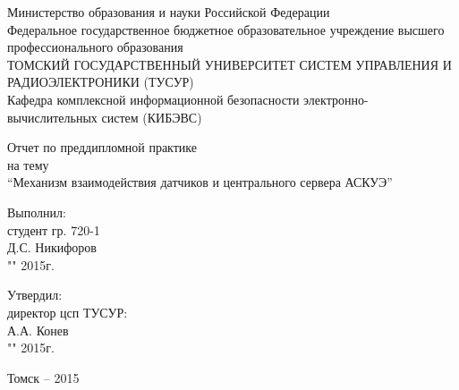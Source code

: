 \newpage
{}

\begin{center}
Министерство образования и науки Российской Федерации\\
Федеральное государственное бюджетное образовательное учреждение высшего профессионального образования\\
ТОМСКИЙ ГОСУДАРСТВЕННЫЙ УНИВЕРСИТЕТ СИСТЕМ УПРАВЛЕНИЯ И РАДИОЭЛЕКТРОНИКИ (ТУСУР)\\
Кафедра комплексной информационной безопасности электронно-вычислительных систем (КИБЭВС)\\
\end{center}

\vspace{2cm}

\begin{center}
Отчет по преддипломной практике \\
на тему \\
``Механизм взаимодействия датчиков и центрального сервера АСКУЭ''
\end{center}

\vspace{2cm}

\begin{flushright}
Выполнил: \\
студент гр. 720-1 \\
\underline{\hspace{2.5cm}}Д.С. Никифоров \\
"\underline{\hspace{1cm}}"\underline{\hspace{3cm}} 2015г.\\
\end{flushright}

\begin{flushright}
Утвердил: \\
директор цсп ТУСУР: \\
\underline{\hspace{2.5cm}}А.А. Конев \\
"\underline{\hspace{1cm}}"\underline{\hspace{3cm}} 2015г.\\
\end{flushright}

\vfill
\begin{center}
Томск -- 2015
\end{center}